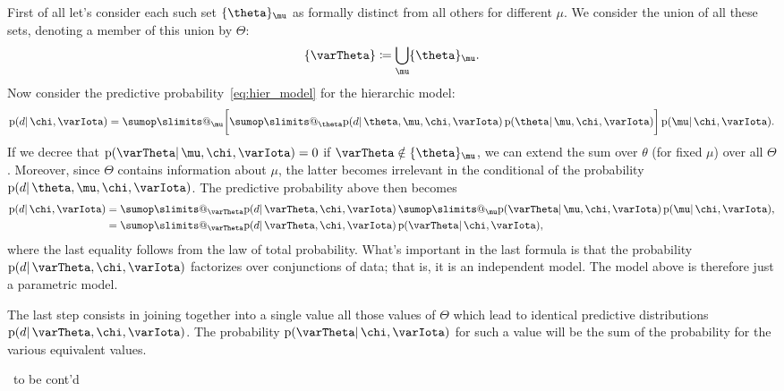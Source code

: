 \documentclass[\ifafour a4paper,12pt,\else a5paper,10pt,\fi%
onecolumn,oneside,article,%
british%
]{memoir}
\makeatletter
\theoremstyle{remark}
\theoremstyle{innote}
\def\sum{\DOTSI\sumop\slimits@}
\newcommand*{\defd}{\coloneqq}
\DeclarePairedDelimiter\set{\{}{\}}
\newcommand*{\pf}{\mathrm{p}}%
\renewcommand*{\|}{\mathpunct{|}}
\newcommand*{\puzzle}{\maltese}
\newcommand{\mynote}[1]{ {\color{notecolour}\puzzle\ #1\ }}
\newcommand*{\yI}{\varIota}
\newcommand*{\yth}{\theta}
\newcommand*{\yTh}{\varTheta}
\newcommand*{\ymu}{\mu}
\newcommand*{\yh}{\chi}
\makeatother
\begin{document}
First of all let's consider each such set $\set{\yth}_{\ymu}$ as formally
distinct from all others for different $\ymu$. We consider the union of all
these sets, denoting a member of this union by $\yTh$:
\begin{equation}
  \label{eq:union_indip_models}
  \set{\yTh} \defd \bigcup_{\ymu}\set{\yth}_{\ymu}.
\end{equation}
Now consider the predictive probability~\eqref{eq:hier_model} for the
hierarchic model:
\begin{equation}
  \label{eq:hier_model_simple}
  \pf(d \| \yh, \yI) =
\sum_\ymu\biggl[ \sum_{\yth}
\pf(d \|\yth,\ymu,\yh,\yI)\,
     \pf(\yth \| \ymu,\yh, \yI)\biggr]\,
     \pf(\ymu \| \yh,\yI).
\end{equation}
If we decree that $\pf(\yTh \| \ymu,\yh,\yI) = 0$ if $\yTh \notin
\set{\yth}_{\ymu}$, we can extend the sum over $\yth$ (for fixed $\ymu$)
over all $\yTh$. Moreover, since $\yTh$ contains information about $\ymu$,
the latter becomes irrelevant in the conditional of the probability $\pf(d
\|\yth,\ymu,\yh,\yI)$. The predictive probability above then becomes
\begin{equation}
  \label{eq:hier_model_Theta}
  \begin{split}
  \pf(d \| \yh, \yI) &=
\sum_{\yTh}
\pf(d \|\yTh,\yh,\yI)\, \sum_\ymu 
     \pf(\yTh \| \ymu,\yh, \yI)\,
     \pf(\ymu \| \yh,\yI),
\\ &= \sum_{\yTh}
\pf(d \|\yTh,\yh,\yI)\,
     \pf(\yTh \| \yh, \yI),
   \end{split}
\end{equation}
where the last equality follows from the law of total probability. What's
important in the last formula is that the probability
$\pf(d \|\yTh,\yh,\yI)$ factorizes over conjunctions of data; that is, it
is an independent model. The model above is therefore just a parametric
model.

The last step consists in joining together into a single value all those
values of $\yTh$ which lead to identical predictive distributions
$\pf(d \|\yTh,\yh,\yI)$. The probability $\pf(\yTh \| \yh, \yI)$  for such
a value will be the sum of the probability for the various equivalent values.

\mynote{to be cont'd}



\end{document}
